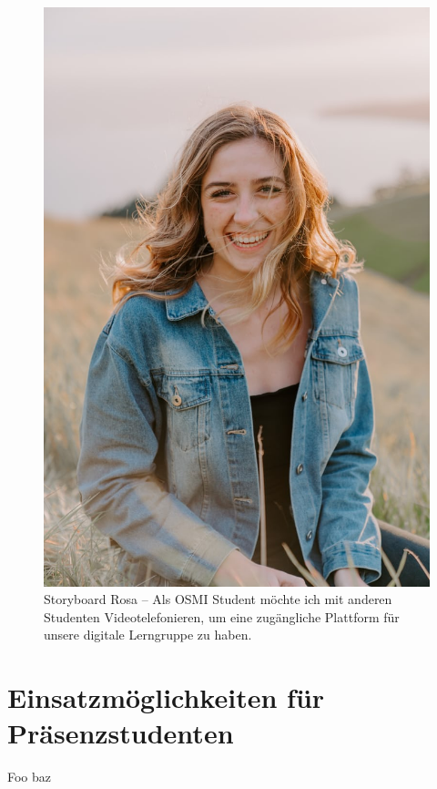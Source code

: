 \documentclass{article}
\begin{document}
\begin{figure}[h]
	\includegraphics[angle=90,width=\textwidth]{rosa}
	\centering
	\caption{Storyboard Rosa – Als OSMI Student möchte ich mit anderen Studenten Videotelefonieren, um eine zugängliche Plattform für unsere digitale Lerngruppe zu haben.}
\end{figure}

\newpage

\section{Einsatzmöglichkeiten für Präsenzstudenten}

Foo baz
\end{document}
